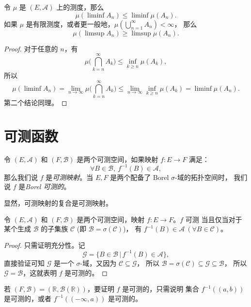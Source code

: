 \documentclass[fontset=none]{Notes}
\begin{document}
\begin{lemma}
  令 $\mu$ 是 $(E,\mathcal{A})$ 上的测度，那么
  \[
    \mu(\liminf A_n)\leq \liminf \mu(A_n).
  \]
  如果 $\mu$ 是有限测度，或者更一般地，$\mu\left(\bigcup_{n=1}^\infty A_n\right)<\infty$，
  那么
  \[
    \mu(\limsup A_n)\geq\limsup\mu(A_n).
  \]
\end{lemma}
\begin{proof}
  对于任意的 $n$，有 
  \[
    \mu\biggl(\bigcap_{k=n}^\infty A_k\biggr)\leq \inf_{k\geq n}\mu(A_k),
  \]
  所以
  \[
    \mu(\liminf A_n)=\lim_{n\to\infty}\mu\biggl(\bigcap_{k=n}^\infty A_k\biggr)
    \leq \lim_{n\to\infty}\inf_{k\geq n}\mu(A_k)=\liminf \mu(A_n).
  \]
  第二个结论同理。
\end{proof}

\section{可测函数}

\begin{definition}
  令 $(E,\mathcal{A})$ 和 $(F,\mathcal{B})$ 是两个可测空间，如果映射 $f:E\to F$ 满足：
  \[
    \forall B\in \mathcal{B},\  f^{-1}(B)\in \mathcal{A},
  \]
  那么我们说 $f$ 是\emph{可测映射}。当 $E,F$ 是两个配备了 Borel $\sigma$-域的拓扑空间时，
  我们说 $f$ 是\emph{Borel 可测的}。
\end{definition}

显然，可测映射的复合是可测映射。

\begin{proposition}
  令 $(E,\mathcal{A})$ 和 $(F,\mathcal{B})$ 是两个可测空间，映射 $f:E\to F$。$f$ 可测
  当且仅当对于某个生成 $\mathcal{B}$ 的子集族 $\mathcal{C}$ (即 $\mathcal{B}=\sigma(\mathcal{C})$)，
  有 $f^{-1}(B)\in \mathcal{A}\ (\forall B\in \mathcal{C})$。
\end{proposition}
\begin{proof}
  只需证明充分性。记
  \[
    \mathcal{G}=\{B\in \mathcal{B}\,|\, f^{-1}(B)\in \mathcal{A}\},
  \]
  直接验证可知 $\mathcal{G}$ 是一个 $\sigma$-域，又因为 $\mathcal{C}\subseteq \mathcal{G}$，
  所以 $\mathcal{B}=\sigma(\mathcal{C})\subseteq \mathcal{G}\subseteq \mathcal{B}$，
  所以 $\mathcal{G}=\mathcal{B}$，这就表明 $f$ 是可测的。
\end{proof}

\begin{example}
  若 $(F,\mathcal{B})=(\mathbb{R},\mathcal{B}(\mathbb{R}))$，要证明 $f$ 是可测的，只需说明
  集合 $f^{-1}((a,b))$ 是可测的，或者 $f^{-1}((-\infty,a))$ 是可测的。
\end{example}
\end{document}
